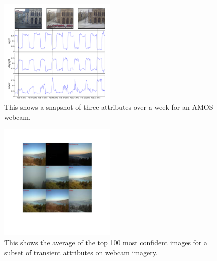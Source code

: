 \documentclass[10pt,twocolumn,letterpaper]{article}
\begin{document}
\begin{figure}[t]
	\centering
		\includegraphics[width=0.5\textwidth]{figs/attr_compare.pdf}
		\caption{This shows a snapshot of three attributes over a week for an AMOS
             webcam.}
		\label{fig:attrcmp}
\end{figure}

\begin{figure}[t]
	\centering
		\includegraphics[width=0.5\textwidth, trim= 35mm 50mm 30mm 31mm]{figs/montage_pruned_cam_00007371.pdf}
		\caption{This shows the average of the top 100 most confident images for
             a subset of transient attributes on webcam imagery.} 
		\label{fig:netvis}
\end{figure}
\end{document}
